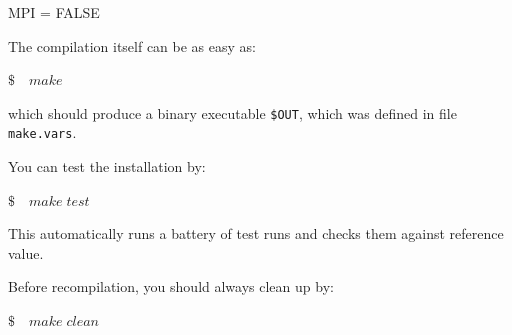 \medskip
\colorbox{black!20}{MPI = FALSE}

\noindent
The compilation itself can be as easy as:

\medskip
\colorbox{black!20}{$ \$\quad make$}

\noindent which should produce a binary executable \verb|$OUT|, which was defined in file \verb|make.vars|.

\bigskip\noindent
You can test the installation by:

\medskip
\colorbox{black!20}{$ \$ \quad make \; test$}

\medskip\noindent
This automatically runs a battery of test runs and checks them against reference value.

\medskip
\noindent Before recompilation, you should always clean up by:

\medskip
\colorbox{black!20}{$ \$ \quad make \; clean$}